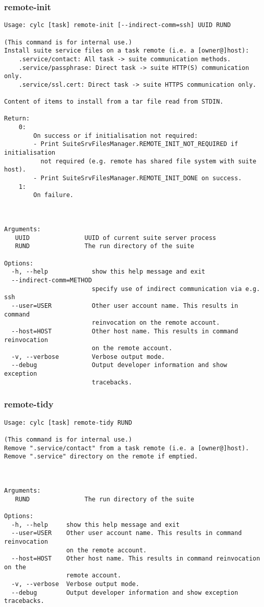 \subsubsection{remote-init}
\label{remote-init}
\begin{lstlisting}
Usage: cylc [task] remote-init [--indirect-comm=ssh] UUID RUND

(This command is for internal use.)
Install suite service files on a task remote (i.e. a [owner@]host):
    .service/contact: All task -> suite communication methods.
    .service/passphrase: Direct task -> suite HTTP(S) communication only.
    .service/ssl.cert: Direct task -> suite HTTPS communication only.

Content of items to install from a tar file read from STDIN.

Return:
    0:
        On success or if initialisation not required:
        - Print SuiteSrvFilesManager.REMOTE_INIT_NOT_REQUIRED if initialisation
          not required (e.g. remote has shared file system with suite host).
        - Print SuiteSrvFilesManager.REMOTE_INIT_DONE on success.
    1:
        On failure.



Arguments:
   UUID               UUID of current suite server process
   RUND               The run directory of the suite

Options:
  -h, --help            show this help message and exit
  --indirect-comm=METHOD
                        specify use of indirect communication via e.g. ssh
  --user=USER           Other user account name. This results in command
                        reinvocation on the remote account.
  --host=HOST           Other host name. This results in command reinvocation
                        on the remote account.
  -v, --verbose         Verbose output mode.
  --debug               Output developer information and show exception
                        tracebacks.
\end{lstlisting}
\subsubsection{remote-tidy}
\label{remote-tidy}
\begin{lstlisting}
Usage: cylc [task] remote-tidy RUND

(This command is for internal use.)
Remove ".service/contact" from a task remote (i.e. a [owner@]host).
Remove ".service" directory on the remote if emptied.



Arguments:
   RUND               The run directory of the suite

Options:
  -h, --help     show this help message and exit
  --user=USER    Other user account name. This results in command reinvocation
                 on the remote account.
  --host=HOST    Other host name. This results in command reinvocation on the
                 remote account.
  -v, --verbose  Verbose output mode.
  --debug        Output developer information and show exception tracebacks.
\end{lstlisting}

